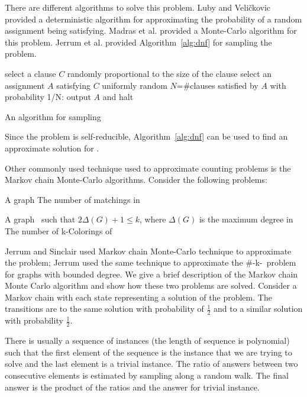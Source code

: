 There are different algorithms to solve this problem.
Luby and Veli\v{c}kovic \cite{Luby} provided a deterministic algorithm for
approximating the probability of a random assignment being satisfying. 
Madras et al. \cite{Madras} provided a Monte-Carlo algorithm
for this problem. Jerrum et al. \cite{JVV} provided Algorithm~\ref{alg:dnf} for sampling 
the  problem.
\begin{algorithm}[h]
\begin{algorithmic}
	\STATE  select a clause \(C\) randomly proportional to the size of the clause
	\STATE  select an assignment \(A\) satisfying \(C\) uniformly random
	\STATE  \(N\)=\#clauses satisfied by \(A\)
	\STATE with probability 1/N: output \(A\) and halt
\ENDWHILE
\end{algorithmic}
\caption{An algorithm for sampling }\label{alg:dnf}
\end{algorithm}

Since the  problem is self-reducible, Algorithm~\ref{alg:dnf} can
be used to find an approximate solution for \@.

Other commonly used technique used to approximate counting problems is the Markov chain
Monte-Carlo algorithms. Consider the following problems:

{A graph \mG}
{The number of matchings in \mG}

\newcommand{\ldkcol}{\#\pname{LowDegree}-k-\pname{Coloring}}
\pdef{\ldkcol}
{A graph \mG\ such that \(2\Delta(G)+1\le k\), where \(\Delta(G)\)
is the maximum degree in \mG}
{The number of k-Colorings of \mG}

Jerrum and Sinclair \cite{Jerrum96} used Markov chain Monte-Carlo technique 
to approximate the  problem; Jerrum \cite{Jerrum} used the same technique 
to approximate the \ldkcol\ problem for graphs 
with bounded degree. We give a brief description of the Markov chain Monte Carlo algorithm
and show how these two problems are solved.
Consider a Markov chain with each state representing a solution of the problem.
The transitions are to the same solution with probability of \(\frac{1}{2}\) 
and to a similar solution with probability \(\frac{1}{2}\).

There is usually a sequence of instances (the length of sequence is polynomial) such that
the first element of the sequence is the instance  that we are trying to solve
and the last element is a trivial instance.
The ratio of answers between two consecutive elements 
is estimated by sampling along a random walk.
The final answer is the product of the ratios and the answer for trivial instance. 

